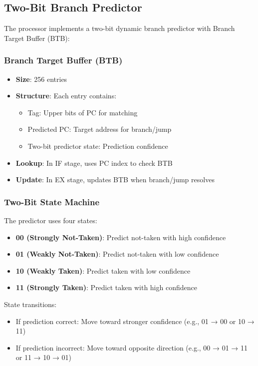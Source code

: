 \subsection{Two-Bit Branch Predictor}

The processor implements a two-bit dynamic branch predictor with Branch Target Buffer (BTB):

\subsubsection{Branch Target Buffer (BTB)}
\begin{itemize}
    \item \textbf{Size}: 256 entries
    \item \textbf{Structure}: Each entry contains:
    \begin{itemize}
        \item Tag: Upper bits of PC for matching
        \item Predicted PC: Target address for branch/jump
        \item Two-bit predictor state: Prediction confidence
    \end{itemize}
    \item \textbf{Lookup}: In IF stage, uses PC index to check BTB
    \item \textbf{Update}: In EX stage, updates BTB when branch/jump resolves
\end{itemize}

\subsubsection{Two-Bit State Machine}
The predictor uses four states:
\begin{itemize}
    \item \textbf{00 (Strongly Not-Taken)}: Predict not-taken with high confidence
    \item \textbf{01 (Weakly Not-Taken)}: Predict not-taken with low confidence
    \item \textbf{10 (Weakly Taken)}: Predict taken with low confidence
    \item \textbf{11 (Strongly Taken)}: Predict taken with high confidence
\end{itemize}

State transitions:
\begin{itemize}
    \item If prediction correct: Move toward stronger confidence (e.g., 01 → 00 or 10 → 11)
    \item If prediction incorrect: Move toward opposite direction (e.g., 00 → 01 → 11 or 11 → 10 → 01)
\end{itemize}

